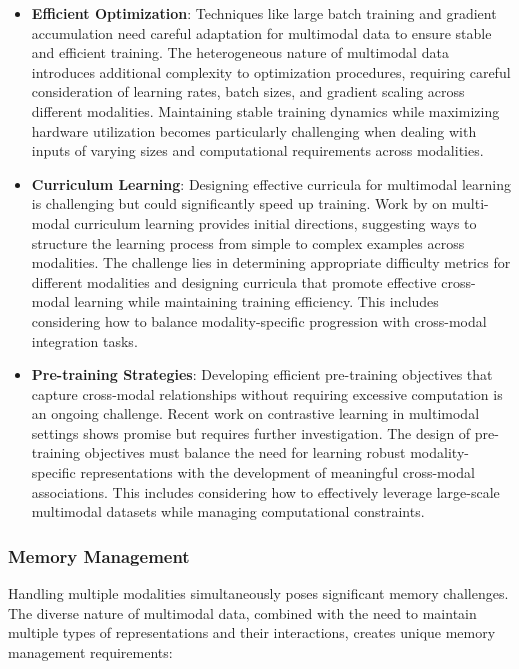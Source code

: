 \begin{itemize}
    \item \textbf{Efficient Optimization}: Techniques like large batch training and gradient accumulation need careful adaptation for multimodal data to ensure stable and efficient training. The heterogeneous nature of multimodal data introduces additional complexity to optimization procedures, requiring careful consideration of learning rates, batch sizes, and gradient scaling across different modalities. Maintaining stable training dynamics while maximizing hardware utilization becomes particularly challenging when dealing with inputs of varying sizes and computational requirements across modalities.
    
    \item \textbf{Curriculum Learning}: Designing effective curricula for multimodal learning is challenging but could significantly speed up training. Work by on multi-modal curriculum learning provides initial directions, suggesting ways to structure the learning process from simple to complex examples across modalities. The challenge lies in determining appropriate difficulty metrics for different modalities and designing curricula that promote effective cross-modal learning while maintaining training efficiency. This includes considering how to balance modality-specific progression with cross-modal integration tasks.
    
    \item \textbf{Pre-training Strategies}: Developing efficient pre-training objectives that capture cross-modal relationships without requiring excessive computation is an ongoing challenge. Recent work on contrastive learning in multimodal settings \citep{jia2021scaling} shows promise but requires further investigation. The design of pre-training objectives must balance the need for learning robust modality-specific representations with the development of meaningful cross-modal associations. This includes considering how to effectively leverage large-scale multimodal datasets while managing computational constraints.
\end{itemize}

\subsubsection{Memory Management}
Handling multiple modalities simultaneously poses significant memory challenges. The diverse nature of multimodal data, combined with the need to maintain multiple types of representations and their interactions, creates unique memory management requirements:


